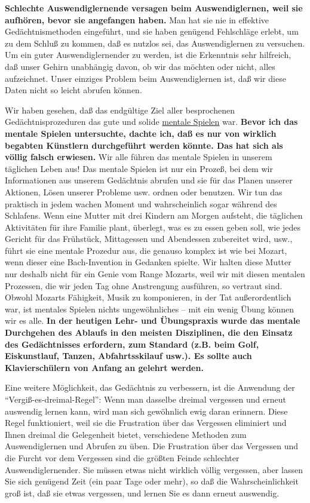 \textbf{Schlechte Auswendiglernende versagen beim Auswendiglernen, weil sie aufhören, bevor sie angefangen haben.}
Man hat sie nie in effektive Gedächtnismethoden eingeführt, und sie haben genügend Fehlschläge erlebt, um zu dem Schluß zu kommen, daß es nutzlos sei, das Auswendiglernen zu versuchen.
Um ein guter Auswendiglernender zu werden, ist die Erkenntnis sehr hilfreich, daß unser Gehirn unabhängig davon, ob wir das möchten oder nicht, alles aufzeichnet.
Unser einziges Problem beim Auswendiglernen ist, daß wir diese Daten nicht so leicht abrufen können.

Wir haben gesehen, daß das endgültige Ziel aller besprochenen Gedächtnisprozeduren das gute und solide \hyperref[c1ii12mental]{mentale Spielen} war.
\textbf{Bevor ich das mentale Spielen untersuchte, dachte ich, daß es nur von wirklich begabten Künstlern durchgeführt werden könnte.
Das hat sich als völlig falsch erwiesen.}
Wir alle führen das mentale Spielen in unserem täglichen Leben aus!
Das mentale Spielen ist nur ein Prozeß, bei dem wir Informationen aus unserem Gedächtnis abrufen und sie für das Planen unserer Aktionen, Lösen unserer Probleme usw. ordnen oder benutzen.
Wir tun das praktisch in jedem wachen Moment und wahrscheinlich sogar während des Schlafens.
Wenn eine Mutter mit drei Kindern am Morgen aufsteht, die täglichen Aktivitäten für ihre Familie plant, überlegt, was es zu essen geben soll, wie jedes Gericht für das Frühstück, Mittagessen und Abendessen zubereitet wird, usw., führt sie eine mentale Prozedur aus, die genauso komplex ist wie bei Mozart, wenn dieser eine Bach-Invention in Gedanken spielte.
Wir halten diese Mutter nur deshalb nicht für ein Genie vom Range Mozarts, weil wir mit diesen mentalen Prozessen, die wir jeden Tag ohne Anstrengung ausführen, so vertraut sind.
Obwohl Mozarts Fähigkeit, Musik zu komponieren, in der Tat außerordentlich war, ist mentales Spielen nichts ungewöhnliches -- mit ein wenig Übung können wir es alle.
\textbf{In der heutigen Lehr- und Übungspraxis wurde das mentale Durchgehen des Ablaufs in den meisten Disziplinen, die den Einsatz des Gedächtnisses erfordern, zum Standard (z.B. beim Golf, Eiskunstlauf, Tanzen, Abfahrtsskilauf usw.).
Es sollte auch Klavierschülern von Anfang an gelehrt werden.}

Eine weitere Möglichkeit, das Gedächtnis zu verbessern, ist die Anwendung der \enquote{Vergiß-es-dreimal-Regel}: Wenn man dasselbe dreimal vergessen und erneut auswendig lernen kann, wird man sich gewöhnlich ewig daran erinnern.
Diese Regel funktioniert, weil sie die Frustration über das Vergessen eliminiert und Ihnen dreimal die Gelegenheit bietet, verschiedene Methoden zum Auswendiglernen und Abrufen zu üben.
Die Frustration über das Vergessen und die Furcht vor dem Vergessen sind die größten Feinde schlechter Auswendiglernender.
Sie müssen etwas nicht wirklich völlig vergessen, aber lassen Sie sich genügend Zeit (ein paar Tage oder mehr), so daß die Wahrscheinlichkeit groß ist, daß sie etwas vergessen, und lernen Sie es dann erneut auswendig.

